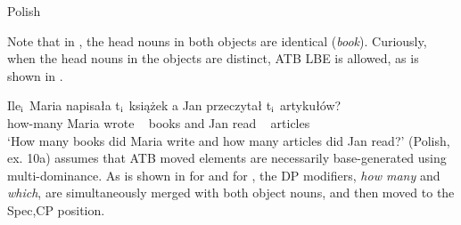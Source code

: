 \documentclass[output=paper]{langscibook}
\begin{document}
\ea Polish
	\label{shenatb1}
	\z 
\z 

Note that in , the head nouns in both objects are identical (\textit{book}). Curiously, when the head nouns in the objects are distinct, ATB LBE is allowed, as is shown in .

\ea
	\label{shenatb2}
	\gll Ile$_{\textnormal{i}}$ Maria napisała t$_{\textnormal{i}}$ książek a Jan przeczytał t$_{\textnormal{i}}$ artykułów? \\
	how-many Maria wrote {~} books and Jan read {~} articles\\
	\glt `How many books did Maria write and how many articles did Jan read?'  (Polish, \citealt{Citko:2006} ex. 10a)
\z 
\citet{Citko:2006} assumes that ATB moved elements are necessarily base-generated using multi-dominance. As is shown in  for  and  for , the DP modifiers, \textit{how many} and \textit{which}, are simultaneously merged with both object nouns, and then moved to the Spec,CP position.  
\end{document}
